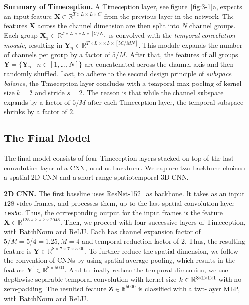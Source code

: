 \documentclass[10pt,twocolumn,letterpaper]{article}
\newcommand{\partitle}[1]{\noindent\textbf{#1}}
\begin{document}
\partitle{Summary of Timeception.}
A Timeception layer, see figure~\ref{fig:3-1}{\color{red}a}, expects an input feature $\mathbf{X} \in \mathbb{R}^{T \times L \times L \times C}$ from the previous layer in the network.
The features $\mathbf{X}$ across the channel dimension are then split into $N$ channel groups.
Each group $\mathbf{X}_n \in \mathbb{R}^{T \times L \times \times L \times [C/N]}$ is convolved with the \emph{temporal convolution module}, resulting in $\mathbf{Y}_n \in \mathbb{R}^{T \times L \times \times L \times [5C/MN]}$.
This module expands the number of channels per group by a factor of $5/M$.
After that, the features of all groups $\mathbf{Y} = \{ \mathbf{Y}_n \mid n \in [1, ..., N]\}$ are concatenated across the channel axis and then randomly shuffled.
Last, to adhere to the second design principle of \emph{subspace balance}, the Timeception layer concludes with a temporal max pooling of kernel size $k=2$ and stride $s=2$.
The reason is that while the channel subspace expands by a factor of $5/M$ after each Timeception layer, the temporal subspace shrinks by a factor of $2$.

\subsection{The Final Model}
The final model consists of four Timeception layers stacked on top of the last convolution layer of a CNN, used as backbone.
We explore two backbone choices: a spatial 2D CNN and a short-range spatiotemporal 3D CNN.

\partitle{2D CNN.}
The first baseline uses ResNet-152~\cite{he2016deep} as backbone.
It takes as an input $128$ video frames, and processes them, up to the last spatial convolution layer \texttt{res5c}.
Thus, the corresponding output for the input frames is the feature $\mathbf{X} \in \mathbb{R}^{128 \times 7 \times 7 \times 2048}$.
Then, we proceed with four successive layers of Timeception, with BatchNorm and ReLU.
Each has channel expansion factor of $5/M = 5/4 = 1.25, M=4$ and temporal reduction factor of $2$.
Thus, the resulting feature is $\mathbf{Y} \in \mathbb{R}^{8 \times 7 \times 7 \times 5000}$.
To further reduce the spatial dimension, we follow the convention of CNNs by using spatial average pooling, which results in the feature $\mathbf{Y^{\prime}} \in \mathbb{R}^{8 \times 5000}$.
And to finally reduce the temporal dimension, we use depthwise-separable temporal convolution with kernel size $k \in \mathbb{R}^{8{\mkern-2mu\times\mkern-2mu} 1 {\mkern-2mu\times\mkern-2mu} 1 {\mkern-2mu\times\mkern-2mu} 1}$ with no zero-padding.
The resulted feature $\mathbf{Z} \in \mathbb{R}^{5000}$ is classified with a two-layer MLP, with BatchNorm and ReLU.
\end{document}
